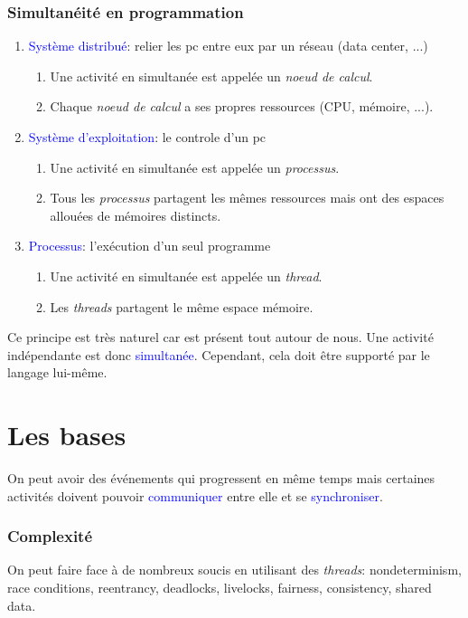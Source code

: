 \documentclass{report}
\begin{document}
\subsubsection{Simultanéité en programmation}
\noindent
\begin{enumerate}
\item \textcolor{blue}{Système distribué}: relier les pc entre eux par un réseau (data center, ...)
	\begin{enumerate}
	\item Une activité en simultanée est appelée un \textit{noeud de calcul}.
	\item Chaque \textit{noeud de calcul} a ses propres ressources (CPU, mémoire, ...).
	\end{enumerate}
\item \textcolor{blue}{Système d'exploitation}: le controle d'un pc
	\begin{enumerate}
	\item Une activité en simultanée est appelée un \textit{processus}.
	\item Tous les \textit{processus} partagent les mêmes ressources mais ont des espaces allouées de mémoires distincts.
	\end{enumerate}
\item \textcolor{blue}{Processus}: l'exécution d'un seul programme
	\begin{enumerate}
	\item Une activité en simultanée est appelée un \textit{thread}.
	\item Les \textit{threads} partagent le même espace mémoire.
	\end{enumerate}
\end{enumerate}
Ce principe est très naturel car est présent tout autour de nous. Une activité indépendante est donc \textcolor{blue}{simultanée}. Cependant, cela doit être supporté par le langage lui-même.

\section{Les bases}
On peut avoir des événements qui progressent en même temps mais certaines activités doivent pouvoir \textcolor{blue}{communiquer} entre elle et se \textcolor{blue}{synchroniser}.

\subsubsection{Complexité}
On peut faire face à de nombreux soucis en utilisant des \textit{threads}: nondeterminism, race conditions, reentrancy, deadlocks, livelocks, fairness, consistency, shared data.\\
\end{document}
